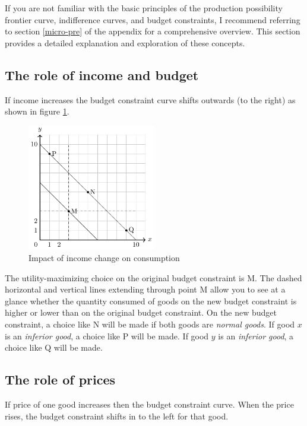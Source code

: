 \documentclass[
  12pt,
  oneside]{book}
\theoremstyle{definition}
\theoremstyle{definition}
\theoremstyle{definition}
\theoremstyle{definition}
\theoremstyle{remark}
\begin{document}
If you are not familiar with the basic principles of the production possibility frontier curve, indifference curves, and budget constraints, I recommend referring to section \ref{micro-pre} of the appendix for a comprehensive overview. This section provides a detailed explanation and exploration of these concepts.

\subsection{The role of income and budget}\label{the-role-of-income-and-budget}

If income increases the budget constraint curve shifts outwards (to the right) as shown in figure \ref{fig:incomechange}.

\begin{figure}
\centering
\includegraphics[width=0.5\textwidth,height=\textheight]{fig/incomechange.png}
\caption{\label{fig:incomechange} Impact of income change on consumption}
\end{figure}

The utility-maximizing choice on the original budget constraint is M. The dashed horizontal and vertical lines extending through point M allow you to see at a glance whether the quantity consumed of goods on the new budget constraint is higher or lower than on the original budget constraint. On the new budget constraint, a choice like N will be made if both goods are \emph{normal goods}. If good \(x\) is an \emph{inferior good}, a choice like P will be made. If good \(y\) is an \emph{inferior good}, a choice like Q will be made.

\subsection{The role of prices}\label{the-role-of-prices}

If price of one good increases then the budget constraint curve. When the price rises, the budget constraint shifts in to the left for that good.
\end{document}
